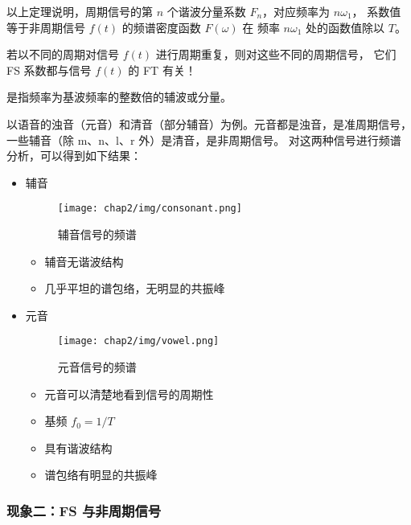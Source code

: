 以上定理说明，周期信号的第 $n$ 个谐波分量系数 $F_n$，对应频率为 $n\omega_1$，
系数值等于非周期信号 $f(t)$ 的频谱密度函数 $F(\omega)$ 在
频率 $n\omega_1$ 处的函数值除以 $T$。

若以不同的周期对信号 $f(t)$ 进行周期重复，则对这些不同的周期信号，
它们 FS 系数都与信号 $f(t)$ 的 FT 有关！

\begin{definition}[谐波]
    是指频率为基波频率的整数倍的辅波或分量。
\end{definition}

\begin{example}[准周期信号的 FT]
    以语音的浊音（元音）和清音（部分辅音）为例。元音都是浊音，是准周期信号，
    一些辅音（除 m、n、l、r 外）是清音，是非周期信号。
    对这两种信号进行频谱分析，可以得到如下结果：
    \begin{itemize}
        \item 辅音
        \begin{figure}[H]
            \centering
            \texttt{[image: chap2/img/consonant.png]}
            \caption{辅音信号的频谱}
            \label{fig:consonant}
        \end{figure}
        \begin{itemize}
            \item 辅音无谐波结构
            \item 几乎平坦的谱包络，无明显的共振峰
        \end{itemize}
        \item 元音
            \begin{figure}[H]
                \centering
                \texttt{[image: chap2/img/vowel.png]}
                \caption{元音信号的频谱}
                \label{fig:vowel}
            \end{figure}
            \begin{itemize}
                \item 元音可以清楚地看到信号的周期性
                \item 基频 $f_0 = 1/T$
                \item 具有谐波结构
                \item 谱包络有明显的共振峰
            \end{itemize}
    \end{itemize}
\end{example}

\subsubsection{现象二：FS 与非周期信号}

